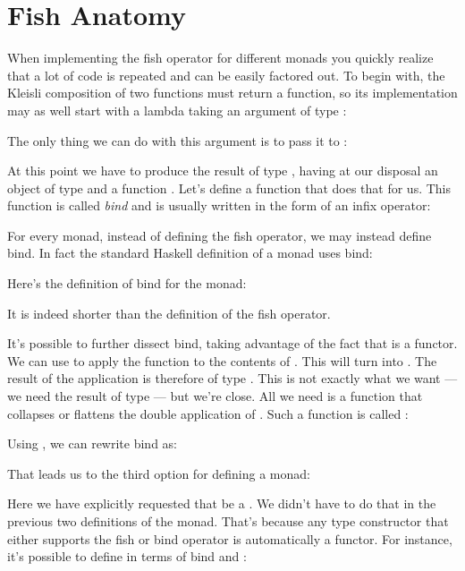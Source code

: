 \section{Fish Anatomy}

When implementing the fish operator for different monads you quickly
realize that a lot of code is repeated and can be easily factored out.
To begin with, the Kleisli composition of two functions must return a
function, so its implementation may as well start with a lambda taking
an argument of type :

The only thing we can do with this argument is to pass it to :

At this point we have to produce the result of type ,
having at our disposal an object of type  and a function
. Let's define a function that
does that for us. This function is called \emph{bind} and is usually written in
the form of an infix operator:

For every monad, instead of defining the fish operator, we may instead
define bind. In fact the standard Haskell definition of a monad uses
bind:

Here's the definition of bind for the  monad:

It is indeed shorter than the definition of the fish operator.

It's possible to further dissect bind, taking advantage of the fact that
 is a functor. We can use  to apply the function
 to the contents of . This
will turn  into . The result of the application
is therefore of type . This is not exactly what we
want --- we need the result of type  --- but we're close.
All we need is a function that collapses or flattens the double
application of . Such a function is called :

Using , we can rewrite bind as:

That leads us to the third option for defining a monad:

Here we have explicitly requested that  be a .
We didn't have to do that in the previous two definitions of the monad.
That's because any type constructor  that either supports the
fish or bind operator is automatically a functor. For instance, it's
possible to define  in terms of bind and :

